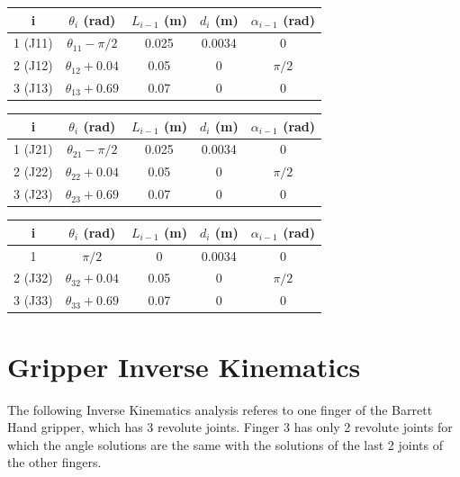 \begin{center}
\begin{tabular}{ |c|c|c|c|c| } 
\hline
i & $θ_i$ (rad) & $L_{i-1}$ (m) & $d_i$ (m) & $α_{i-1}$ (rad) \\
\hline
1 (J11) & $θ_{11} - π/2$ & 0.025 & 0.0034 & 0 \\
2 (J12) & $θ_{12} + 0.04$ & 0.05 & 0 & $π/2$ \\
3 (J13) & $θ_{13} + 0.69$ & 0.07 & 0 & 0 \\
\hline
\end{tabular}
\end{center}

\begin{center}
\begin{tabular}{ |c|c|c|c|c| } 
\hline
i & $θ_i$ (rad) & $L_{i-1}$ (m) & $d_i$ (m) & $α_{i-1}$ (rad) \\
\hline
1 (J21) & $θ_{21} - π/2$ & 0.025 & 0.0034 & 0 \\
2 (J22) & $θ_{22} + 0.04$ & 0.05 & 0 & $π/2$ \\
3 (J23) & $θ_{23} + 0.69$ & 0.07 & 0 & 0 \\
\hline
\end{tabular}
\end{center}

\begin{center}
\begin{tabular}{ |c|c|c|c|c| } 
\hline
i & $θ_i$ (rad) & $L_{i-1}$ (m) & $d_i$ (m) & $α_{i-1}$ (rad) \\
\hline
1 & $π/2$ & 0 & 0.0034 & 0 \\
2 (J32) & $θ_{32} + 0.04$ & 0.05 & 0 & $π/2$ \\
3 (J33) & $θ_{33} + 0.69$ & 0.07 & 0 & 0 \\
\hline
\end{tabular}
\end{center}


\section{Gripper Inverse Kinematics}

The following Inverse Kinematics analysis referes to one finger of the Barrett Hand gripper, which has 3 revolute joints. Finger 3 has only 2 
revolute joints for which the angle solutions are the same with the solutions of the last 2 joints of the other fingers. 


